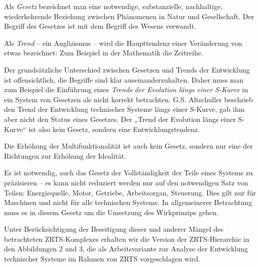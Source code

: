 \documentclass[11pt,a4paper]{article}
\begin{document}
Als \emph{Gesetz} bezeichnet man eine notwendige, substanzielle, nachhaltige,
wiederkehrende Beziehung zwischen Phänomenen in Natur und Gesellschaft. Der
Begriff des Gesetzes ist mit dem Begriff des Wesens verwandt.

Als \emph{Trend} -- ein Anglizismus -- wird die Haupttendenz einer Veränderung
von etwas bezeichnet: Zum Beispiel in der Mathematik die Zeitreihe.

Der grundsätzliche Unterschied zwischen Gesetzen und Trends der Entwicklung
ist offensichtlich, die Begriffe sind klar auseinanderzuhalten. Daher muss man
zum Beispiel die Einführung eines \emph{Trends der Evolution längs einer
  S-Kurve} in ein System von Gesetzen als nicht korrekt betrachten.
G.S. Altschuller beschrieb den Trend der Entwicklung technischer Systeme längs
einer S-Kurve, gab ihm aber nicht den Status eines Gesetzes. Der „Trend der
Evolution längs einer S-Kurve“ ist also kein Gesetz, sondern eine
Entwicklungstendenz.

Die Erhöhung der Multifunktionalität ist auch kein Gesetz, sondern nur eine
der Richtungen zur Erhöhung der Idealität.

Es ist notwendig, auch das Gesetz der Vollständigkeit der Teile eines Systems
zu präzisieren -- es kann nicht reduziert werden nur auf den notwendigen Satz
von Teilen: Energiequelle, Motor, Getriebe, Arbeitsorgan, Steuerung. Dies gilt
nur für Maschinen und nicht für alle technischen Systeme. In allgemeinerer
Betrachtung muss es in diesem Gesetz um die Umsetzung des Wirkprinzips gehen.

Unter Berücksichtigung der Beseitigung dieser und anderer Mängel des
betrachteten ZRTS-Komplexes erhalten wir die Version der ZRTS-Hierarchie in
den Abbildungen 2 und 3, die als Arbeitsvariante zur Analyse der Entwicklung
technischer Systeme im Rahmen von ZRTS vorgeschlagen wird.
\end{document}
